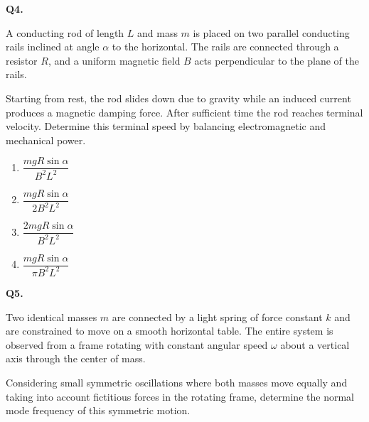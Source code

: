 \documentclass[12pt]{article}
\begin{document}
\bigskip

\textbf{Q4.}

A conducting rod of length $L$ and mass $m$ is placed on two parallel conducting rails inclined at angle $\alpha$ to the horizontal. The rails are connected through a resistor $R$, and a uniform magnetic field $B$ acts perpendicular to the plane of the rails.

Starting from rest, the rod slides down due to gravity while an induced current produces a magnetic damping force. After sufficient time the rod reaches terminal velocity. Determine this terminal speed by balancing electromagnetic and mechanical power.

\begin{center}
\end{center}

\begin{enumerate}
\item[(A)] $\dfrac{mgR\sin\alpha}{B^2L^2}$
\item[(B)] $\dfrac{mgR\sin\alpha}{2B^2L^2}$
\item[(C)] $\dfrac{2mgR\sin\alpha}{B^2L^2}$
\item[(D)] $\dfrac{mgR\sin\alpha}{\pi B^2L^2}$
\end{enumerate}

\bigskip

\textbf{Q5.}

Two identical masses $m$ are connected by a light spring of force constant $k$ and are constrained to move on a smooth horizontal table. The entire system is observed from a frame rotating with constant angular speed $\omega$ about a vertical axis through the center of mass.

Considering small symmetric oscillations where both masses move equally and taking into account fictitious forces in the rotating frame, determine the normal mode frequency of this symmetric motion.
\end{document}
